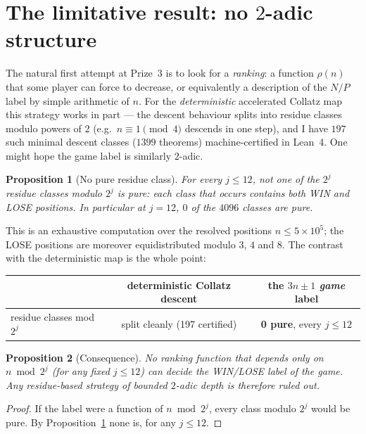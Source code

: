 \documentclass[11pt,a4paper]{article}
\theoremstyle{plain}
\newtheorem{proposition}{Proposition}
\theoremstyle{definition}
\begin{document}
\section{The limitative result: no $2$-adic structure}

The natural first attempt at Prize~3 is to look for a \emph{ranking}: a function $\rho(n)$ that
some player can force to decrease, or equivalently a description of the $N/P$ label by simple
arithmetic of $n$. For the \emph{deterministic} accelerated Collatz map this strategy works in
part --- the descent behaviour splits into residue classes modulo powers of $2$ (e.g.\
$n\equiv1\pmod4$ descends in one step), and I have $197$ such minimal descent classes
($1399$ theorems) machine-certified in Lean~4. One might hope the game label is similarly
$2$-adic.

\begin{proposition}[No pure residue class]\label{prop:nostructure}
For every $j\le12$, \emph{not one} of the $2^{j}$ residue classes modulo $2^{j}$ is pure: each
class that occurs contains both WIN and LOSE positions. In particular at $j=12$, $0$ of the
$4096$ classes are pure.
\end{proposition}

\noindent This is an exhaustive computation over the resolved positions $n\le5\times10^{5}$;
the LOSE positions are moreover equidistributed modulo $3$, $4$ and $8$. The contrast with the
deterministic map is the whole point:

\begin{center}
\begin{tabular}{l c c}
\toprule
 & deterministic Collatz descent & the $3n\pm1$ \emph{game} label\\\midrule
residue classes mod $2^{j}$ & split cleanly (197 certified) & \textbf{0 pure}, every $j\le12$\\
\bottomrule
\end{tabular}
\end{center}

\begin{proposition}[Consequence]\label{prop:consequence}
No ranking function that depends only on $n\bmod2^{j}$ (for any fixed $j\le12$) can decide the
WIN/LOSE label of the game. Any residue-based strategy of bounded $2$-adic depth is therefore
ruled out.
\end{proposition}
\begin{proof}
If the label were a function of $n\bmod2^{j}$, every class modulo $2^{j}$ would be pure. By
Proposition~\ref{prop:nostructure} none is, for any $j\le12$.
\end{proof}
\end{document}
